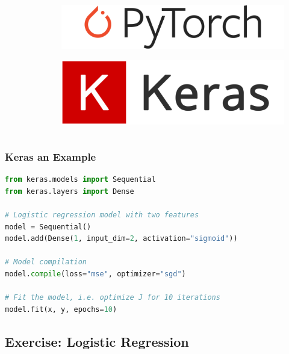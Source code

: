 \documentclass[aspectratio=1610]{beamer}
\newcommand\imageright[1]{ %
    \caption*{\scalebox{.5}{\textcolor{lightgray}{\textcopyright~#1}}} %
}
\begin{document}
\begin{frame}
\begin{columns}
\begin{column}{0.23\textwidth}
\begin{figure}
            \imageright{Apache}
        \end{figure}
    \end{column}
    \begin{column}{0.23\textwidth}
        \vspace{2.5cm}
        \begin{figure}
            \centering
            \includegraphics[width=0.9\linewidth]{pytorch.png}
            \imageright{PyTorch}
        \end{figure}
        \begin{figure}
            \centering
            \includegraphics[width=0.9\linewidth]{keras.png}
            \imageright{Keras}
            \vspace{1.2cm}
        \end{figure}
    \end{column}
\end{columns}
\end{frame}

\begin{frame}[fragile]
\frametitle{Keras an Example}

\begin{lstlisting}[language=Python]
from keras.models import Sequential
from keras.layers import Dense

# Logistic regression model with two features
model = Sequential()
model.add(Dense(1, input_dim=2, activation="sigmoid"))

# Model compilation
model.compile(loss="mse", optimizer="sgd")

# Fit the model, i.e. optimize J for 10 iterations
model.fit(x, y, epochs=10)
\end{lstlisting}

\end{frame}

\subsection{Exercise: Logistic Regression}
\label{subsec:exercise-logistic-regression}
\end{document}
